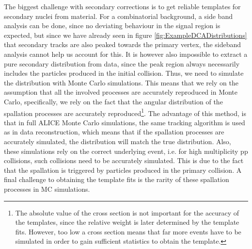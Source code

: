 The biggest challenge with secondary corrections is to get reliable templates for secondary nuclei from material. For a combinatorial background, a side band analysis can be done, since no deviating behaviour in the signal region is expected, but since we have already seen in figure \ref{fig:ExampleDCADistributions} that secondary tracks are also peaked towards the primary vertex, the sideband analysis cannot help us account for this. It is however also impossible to extract a pure secondary distribution from data, since the peak region always necessarily includes the particles produced in the initial collision. Thus, we need to simulate the distribution with Monte Carlo simulations. This means that we rely on the assumption that all the involved processes are accurately reproduced in Monte Carlo, specifically, we rely on the fact that the angular distribution of the spallation processes are accurately reproduced\footnote{The absolute value of the cross section is not important for the accuracy of the templates, since the relative weight is later determined by the template fits. However, too low a cross section means that far more events have to be simulated in order to gain sufficient statistics to obtain the template.}. The advantage of this method, is that in full ALICE Monte Carlo simulations, the same tracking algorithm is used as in data reconstruction, which means that if the spallation processes are accurately simulated, the distribution will match the true distribution. Also, these simulations rely on the correct underlying event, i.e. for high multiplicity pp collisions, such collisions need to be accurately simulated. This is due to the fact that the spallation is triggered by particles produced in the primary collision. A final challenge to obtaining the template fits is the rarity of these spallation processes in MC simulations. \\


